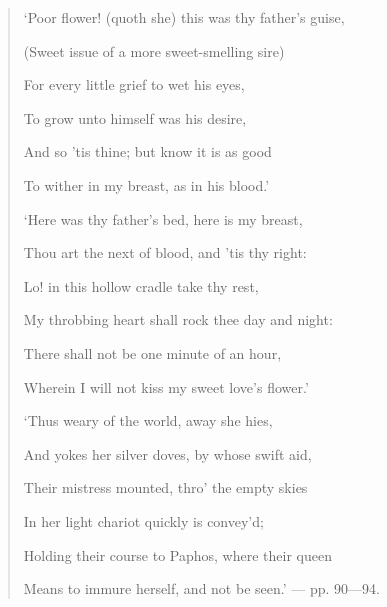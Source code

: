\documentclass[a4paper, 11pt, oneside, polutonikogreek, english]{article}
\begin{document}
\begin{quotation}
\bigskip

`Poor flower! (quoth she) this was thy father's guise,

(Sweet issue of a more sweet-smelling sire)

For every little grief to wet his eyes,

To grow unto himself was his desire,

\hspace*{15mm}And so 'tis thine; but know it is as good

\hspace*{15mm}To wither in my breast, as in his blood.'

\bigskip

`Here was thy father's bed, here is my breast,

Thou art the next of blood, and 'tis thy right:

Lo! in this hollow cradle take thy rest,

My throbbing heart shall rock thee day and night:

\hspace*{15mm}There shall not be one minute of an hour,

\hspace*{15mm}Wherein I will not kiss my sweet love's flower.'

\bigskip

`Thus weary of the world, away she hies,

And yokes her silver doves, by whose swift aid,

Their mistress mounted, thro' the empty skies

In her light chariot quickly is convey'd;

\hspace*{15mm}Holding their course to Paphos, where their queen

\hspace*{15mm}Means to immure herself, and not be seen.' --- pp. 90—94.
\end{quotation}
\end{document}
